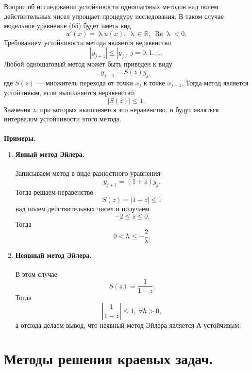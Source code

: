\documentclass[a4paper, 12pt]{report}
\numberwithin{equation}{section}
\newcommand{\Rm}{\mathbb{R}}
\renewcommand{\leq}{\leqslant}
\renewcommand{\lambda}{\uplambda}
\renewcommand{\Re}{\operatorname{Re}}
\begin{document}
	 Вопрос об исследовании устойчивости одношаговых методов над полем действительных чисел упрощает процедуру исследования. В таком случае модельное уравнение (65) будет иметь вид $$u'(x) = \lambda u(x),\ \lambda \in \Rm,\ \Re \lambda < 0.$$
	 Требованием устойчивости метода является неравенство $$|y_{j+1}|\leq |y_j|,\ j = 0,1,\ldots.$$
	 Любой одношаговый метод может быть приведен к виду $$y_{j+1} = S(z) y_j,$$ где $S(z)$ --- множитель перехода от точки $x_j$ к точке $x_{j+1}$. Тогда метод является устойчивым, если выполняется неравенство $$|S(z)|\leq 1.$$ Значения $z$, при которых выполняется это неравенство, и будут являться интервалом устойчивости этого метода.
	 \\\\
	 \textbf{Примеры.}
	 \begin{enumerate}
	 	\item \textbf{Явный метод Эйлера.}\\\\
	 	Записываем метод в виде разностного уравнения $$y_{j+1} = (1+z) y_j.$$
	 	Тогда решаем неравенство $$S(z) = |1+z| \leq 1$$ над полем действительных чисел  и получаем $$-2 \leq z \leq 0.$$ Тогда $$0<h \leq -\dfrac 2 \lambda.$$
	 	\item \textbf{Неявный метод Эйлера.}\\\\
	 	В этом случае $$S(z) = \dfrac{1}{1-z}.$$
	 	Тогда $$\left|\dfrac{1}{1-z}\right|\leq 1,\ \forall h > 0,$$
	 	а отсюда делаем вывод, что неявный метод Эйлера является А-устойчивым.
	 \end{enumerate}
	 \section{Методы решения краевых задач.}
\end{document}
